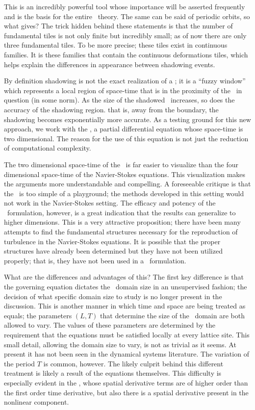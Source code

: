 This is an incredibly powerful
tool whose importance will be asserted frequently and is the basis for the
entire \spt\ theory. The same can be said of periodic orbits, so what gives?
The trick hidden behind these statements is that the number of fundamental
tiles is not only finite but incredibly small; as of now there are only three
fundamental tiles. To be more precise; these tiles exist in
continuous families. It is these families that contain
the continuous deformations tiles, which helps explain the differences
in appearance between shadowing events.

By definition shadowing is not the exact realization of a \twot; it is a ``fuzzy window'' which
represents a local region of space-time that is in the proximity of
the \twot\ in question (in some norm). As the size of the shadowed \twot\
increases, so does the accuracy of the shadowing region. that is, away from
the boundary, the shadowing becomes exponentially more accurate.
As a testing ground for this new approach, we work with the \KSe,
a partial differential equation whose space-time is two dimensional.
The reason for the use of this equation is not just the reduction
of computational complexity.

The two dimensional space-time of the \KSe\ is far easier to visualize than the four
dimensional space-time of the Navier-Stokes equations.
This visualization makes the arguments more
understandable and compelling. A foreseeable critique is
that the \KSe\ is too simple of a playground; the methods developed
in this setting would not work in the Navier-Stokes setting.
The efficacy and potency of the \spt\ formulation,
however, is a great indication that the results can generalize
to higher dimensions. This is a very attractive proposition; there have been many attempts to
find the fundamental structures necessary for the reproduction
of turbulence in the Navier-Stokes equations.
It is possible that the proper structures have already been determined but they
have not been utilized properly; that is, they have not been used in a \spt\
formulation.

What are the differences and advantages of this?
The first key difference is that the governing equation
dictates the \spt\ domain size in an unsupervised
fashion; the decision of what specific domain size
to study is no longer present in the discussion.
This is another manner in which
time and space are being treated as equals; the parameters $(L,T)$
that determine the size of the \spt\ domain are both allowed to vary.
The values of these parameters
are determined by the requirement that the equations
must be satisfied locally at every lattice site.
This small detail, allowing the domain size \speriod{} to vary,
is not as trivial as it seems. At present it has not been seen in
the dynamical systems literature. The variation of the period $T$ is
common, however. The likely culprit behind this different treatment
is likely a result of the equations themselves. This difficulty
is especially evident in the \KSe, whose spatial derivative terms
are of higher order than the first order time derivative, but also
there is a spatial derivative present in the nonlinear component.

